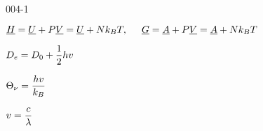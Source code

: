 \begin{mitframe}{004-1}
\begin{listone}
    \item $\uline{\enthalpy}=\uline{\intenergy}+\p\uline{\vol}=\uline{\intenergy}+\nummoles\boltz\Temp,\tab \uline{\gibbs}=\uline{\helmholtz}+\p\uline{\vol}=\uline{\helmholtz}+\nummoles\boltz\Temp$
    
    
    \item $\eneatom=\mbde+\dfrac{1}{2}\planck\waven$

    \item $\vibrfreqfac=\dfrac{\planck\waven}{\boltz}$
    
    \item $\waven=\dfrac{\lightspeed}{\wavel}$   
    
\end{listone}			

\end{mitframe}